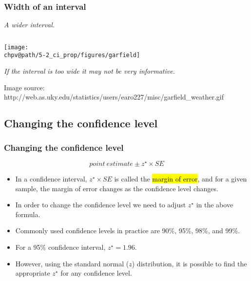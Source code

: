 \documentclass[t,compress,mathserif]{beamer}
\makeatletter
\newcommand{\soln}[1]{\textit{#1}}
\def\chpv@path{../../Chp 5}
\makeatother
\begin{document}

\begin{frame}
\frametitle{Width of an interval}


\pause

\soln{A wider interval.}

$\:$ \\


\begin{center}
\texttt{[image: \\chpv@path/5-2\_ci\_prop/figures/garfield]}
\end{center}


\soln{If the interval is too wide it may not be very informative.}

{\scriptsize Image source: http://web.as.uky.edu/statistics/users/earo227/misc/garfield\_weather.gif}

\end{frame}


\subsection{Changing the confidence level}


\begin{frame}
\frametitle{Changing the confidence level}

\[ point~estimate\pm z^\star \times SE \] 

\begin{itemize}

\item In a confidence interval, $z^\star \times SE$ is called the \hl{margin of error}, and for a given sample, the margin of error changes as the confidence level changes.

\item In order to change the confidence level we need to adjust $z^\star$ in the above formula.

\item Commonly used confidence levels in practice are 90\%, 95\%, 98\%, and 99\%.

\item For a 95\% confidence interval, $z^\star = 1.96$.

\item However, using the standard normal ($z$) distribution, it is possible to find the appropriate $z^\star$ for any confidence level.

\end{itemize}

\end{frame}
\end{document}

